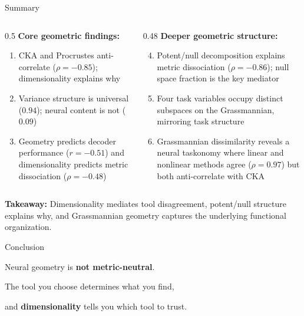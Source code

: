 \documentclass[aspectratio=169,11pt]{beamer}
\begin{document}
\begin{frame}{Summary}
\begin{columns}[T]
\begin{column}{0.5\textwidth}
\textbf{Core geometric findings:}
\begin{enumerate}
  \item CKA and Procrustes anti-correlate ($\rho = -0.85$); dimensionality explains why
  \item Variance structure is universal ($0.94$); neural content is not ($0.09$)
  \item Geometry predicts decoder performance ($r = -0.51$) and dimensionality predicts metric dissociation ($\rho = -0.48$)
\end{enumerate}
\end{column}
\begin{column}{0.48\textwidth}
\textbf{Deeper geometric structure:}
\begin{enumerate}
  \setcounter{enumi}{3}
  \item Potent/null decomposition explains metric dissociation ($\rho = -0.86$); null space fraction is the key mediator
  \item Four task variables occupy distinct subspaces on the Grassmannian, mirroring task structure
  \item Grassmannian dissimilarity reveals a neural taskonomy where linear and nonlinear methods agree ($\rho = 0.97$) but both anti-correlate with CKA
\end{enumerate}
\end{column}
\end{columns}

\vspace{0.5em}
{\small \textbf{Takeaway:} Dimensionality mediates tool disagreement, potent/null structure explains why, and Grassmannian geometry captures the underlying functional organization.}
\end{frame}

\begin{frame}{Conclusion}

\begin{center}
\vspace{0.5em}
{\Large Neural geometry is \textbf{not metric-neutral}.}

\vspace{0.6em}

{\Large The tool you choose determines what you find,}

\vspace{0.2em}

{\Large and \textbf{dimensionality} tells you which tool to trust.}
\end{center}
\end{frame}
\end{document}
